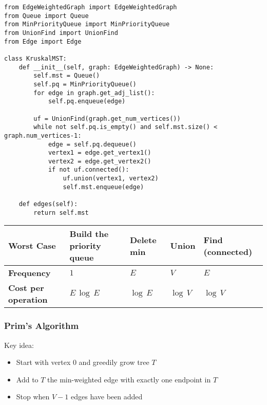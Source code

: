 \documentclass[a4paper]{article}
\begin{document}
\begin{lstlisting}
from EdgeWeightedGraph import EdgeWeightedGraph
from Queue import Queue
from MinPriorityQueue import MinPriorityQueue
from UnionFind import UnionFind
from Edge import Edge

class KruskalMST:
    def __init__(self, graph: EdgeWeightedGraph) -> None:
        self.mst = Queue()
        self.pq = MinPriorityQueue()
        for edge in graph.get_adj_list():
            self.pq.enqueue(edge)

        uf = UnionFind(graph.get_num_vertices())
        while not self.pq.is_empty() and self.mst.size() < graph.num_vertices-1:
            edge = self.pq.dequeue()
            vertex1 = edge.get_vertex1()
            vertex2 = edge.get_vertex2()
            if not uf.connected():
                uf.union(vertex1, vertex2)
                self.mst.enqueue(edge)

    def edges(self):
        return self.mst
\end{lstlisting}
\begin{spacing}{1.5}
\begin{tabularx}{1\textwidth}{|X|X|X|X|X|}
    \hline
    \textbf{\color{blue}Worst Case}&\textbf{Build the priority queue} & \textbf{Delete min} & \textbf{Union} & \textbf{Find (connected)}\\
    \hline
    \textbf{Frequency}&$1$&$E$&$V$&$E$\\
    \hline
    \textbf{Cost per operation}&$E\,\log\,E$&$\log\,E$&$\log\,V$&$\log\,V$\\
    \hline
\end{tabularx}
\end{spacing}

\subsubsection*{Prim's Algorithm}
Key idea:
\begin{itemize}
    \item Start with vertex $0$ and greedily grow tree $T$
    \item Add to $T$ the min-weighted edge with exactly one endpoint in $T$
    \item Stop when $V-1$ edges have been added
\end{itemize}
\end{document}
